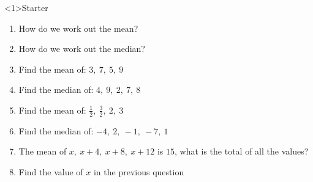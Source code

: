 \documentclass{beamer}
\newcommand{\ashow}[1]{\uncover<2->{\textcolor{red}{\small #1}}}
\newcommand{\ashowq}[1]{\alt<2->{\textcolor{red}{\small #1}}{?}}
\begin{document}
\begin{frame}<1>{Starter}
\vspace{-0.8em}

\footnotesize
\begin{enumerate}\itemsep2pt
  \item How do we work out the mean? \ashow{Add the values and divide by how many there are.}
  \item How do we work out the median? \ashow{Order the data and find the middle value.}
  \item Find the mean of: $3,\ 7,\ 5,\ 9$ \ashow{$=6$}
  \item Find the median of: $4,\ 9,\ 2,\ 7,\ 8$ \ashow{$=7$}
  \item Find the mean of: $\frac{1}{2},\ \frac{3}{2},\ 2,\ 3$ \ashow{$=\frac{7}{4}$}
  \item Find the median of: $-4,\ 2,\ -1,\ -7,\ 1$ \ashow{$=-1$}
  \item The mean of $x,\ x+4,\ x+8,\ x+12$ is $15$, what is the total of all the values? \ashow{$60$}
  \item Find the value of $x$ in the previous question \ashow{$x=9$}
\end{enumerate}

\end{frame}
\end{document}
